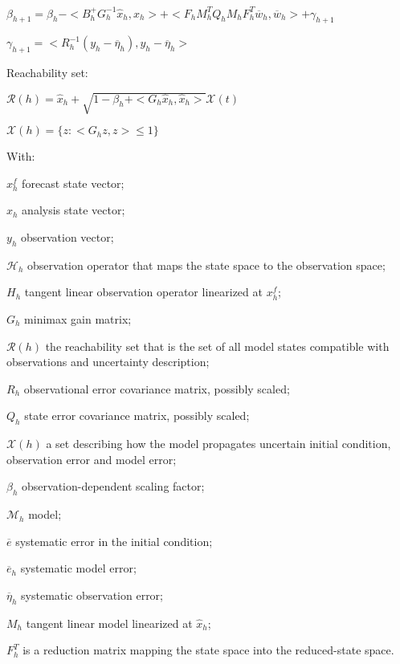 \documentclass{tufte-book}
\begin{document}
\begin{DoxyEnumerate}
\begin{DoxyItemize}
\item $\beta_{h+1} = \beta_h - < B^+_h G_h^{-1}\hat x_h,\hat x_h> + < F_h M^T_h Q_h M_h F_h^T \overline w_h, \overline w_h> + \gamma_{h+1}$\par

\item $\gamma_{h+1} = < R_h^{-1} (y_h-\overline \eta_h),y_h-\overline \eta_h> $\par

\end{DoxyItemize}


\item \-Reachability set\-:
\begin{DoxyItemize}
\item $ \mathcal R(h) = \widehat x_h + \sqrt{1-\beta_h+<G_h\hat x_h,\hat x_h>}\mathcal X(t)$\par

\item $\mathcal X(h) = \{z: <G_h z, z>\le 1\} $\par

\end{DoxyItemize}
\end{DoxyEnumerate}\-With\-: \par
 $x^f_h$ forecast state vector; \par
 $\hat x_h$ analysis state vector; \par
 $y_h$ observation vector; \par
 $\mathcal{H}_h$ observation operator that maps the state space to the observation space; \par
 $H_h$ tangent linear observation operator linearized at $x^f_h$; \par
 $G_h$ minimax gain matrix; \par
 $\mathcal R(h)$ the reachability set that is the set of all model states compatible with observations and uncertainty description; \par
 $R_h$ observational error covariance matrix, possibly scaled; \par
 $Q_h$ state error covariance matrix, possibly scaled; \par
 $\mathcal X(h)$ a set describing how the model propagates uncertain initial condition, observation error and model error; \par
 $\beta_h$ observation-\/dependent scaling factor; \par
 $\mathcal{M}_h$ model; \par
 $\overline e$ systematic error in the initial condition; \par
 $\overline e_h$ systematic model error; \par
 $\overline \eta_h$ systematic observation error; \par
 $M_h$ tangent linear model linearized at $\hat x_h$; \par
 $F^T_h$ is a reduction matrix mapping the state space into the reduced-\/state space.\par
\end{document}
